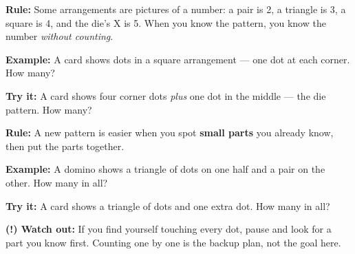 \documentclass[12pt]{article}
\begin{document}


\begin{formulabox}
\textbf{Rule:} Some arrangements are pictures of a number: a pair is 2, a
triangle is 3, a square is 4, and the die's X is 5. When you know the
pattern, you know the number \emph{without counting}.
\end{formulabox}

\begin{examplebox}
\textbf{Example:} \quad A card shows dots in a square arrangement --- one dot
at each corner. How many?
\end{examplebox}

\begin{tryitbox}
\textbf{Try it:} \quad A card shows four corner dots \emph{plus} one dot in
the middle --- the die pattern. How many?\\[2pt]
\end{tryitbox}


\begin{formulabox}
\textbf{Rule:} A new pattern is easier when you spot \textbf{small parts} you
already know, then put the parts together.
\end{formulabox}

\begin{examplebox}
\textbf{Example:} \quad A domino shows a triangle of dots on one half and a
pair on the other. How many in all?
\end{examplebox}

\begin{tryitbox}
\textbf{Try it:} \quad A card shows a triangle of dots and one extra dot. How
many in all?\\[2pt]
\end{tryitbox}

\begin{watchoutbox}
\textbf{(!) Watch out:} If you find yourself touching every dot, pause and
look for a part you know first. Counting one by one is the backup plan, not
the goal here.
\end{watchoutbox}
\end{document}
